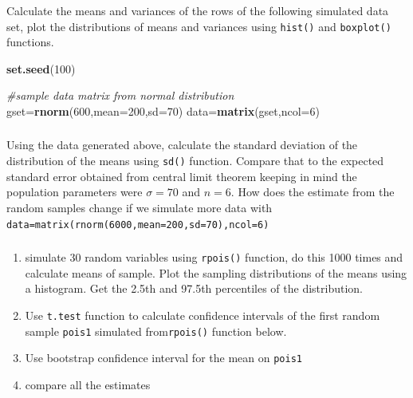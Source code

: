 \documentclass[12pt,]{krantz}
\newenvironment{Shaded}{\begin{snugshade}}{\end{snugshade}}
\newcommand{\CommentTok}[1]{\textcolor[rgb]{0.56,0.35,0.01}{\textit{#1}}}
\newcommand{\DataTypeTok}[1]{\textcolor[rgb]{0.13,0.29,0.53}{#1}}
\newcommand{\DecValTok}[1]{\textcolor[rgb]{0.00,0.00,0.81}{#1}}
\newcommand{\KeywordTok}[1]{\textcolor[rgb]{0.13,0.29,0.53}{\textbf{#1}}}
\newcommand{\NormalTok}[1]{#1}
\providecommand{\tightlist}{%
  \setlength{\itemsep}{0pt}\setlength{\parskip}{0pt}}
\begin{document}
\hypertarget{section}{%
\subsubsection{}\label{section}}

Calculate the means and variances
of the rows of the following simulated data set, plot the distributions
of means and variances using \texttt{hist()} and \texttt{boxplot()} functions.

\begin{Shaded}
\begin{Highlighting}[]
\KeywordTok{set.seed}\NormalTok{(}\DecValTok{100}\NormalTok{)}

\CommentTok{#sample data matrix from normal distribution}
\NormalTok{gset=}\KeywordTok{rnorm}\NormalTok{(}\DecValTok{600}\NormalTok{,}\DataTypeTok{mean=}\DecValTok{200}\NormalTok{,}\DataTypeTok{sd=}\DecValTok{70}\NormalTok{)}
\NormalTok{data=}\KeywordTok{matrix}\NormalTok{(gset,}\DataTypeTok{ncol=}\DecValTok{6}\NormalTok{)}
\end{Highlighting}
\end{Shaded}

\hypertarget{section-1}{%
\subsubsection{}\label{section-1}}

Using the data generated above, calculate the standard deviation of the
distribution of the means using \texttt{sd()} function. Compare that to the expected
standard error obtained from central limit theorem keeping in mind the
population parameters were \(\sigma=70\) and \(n=6\). How does the estimate
from the random samples change if we simulate more data with
\texttt{data=matrix(rnorm(6000,mean=200,sd=70),ncol=6)}

\hypertarget{section-2}{%
\subsubsection{}\label{section-2}}

\begin{enumerate}
\def\labelenumi{\arabic{enumi}.}
\setcounter{enumi}{-1}
\tightlist
\item
  simulate 30 random variables using \texttt{rpois()} function, do this 1000 times and calculate means of sample. Plot the sampling distributions of the means
  using a histogram. Get the 2.5th and 97.5th percentiles of the
  distribution.
\item
  Use \texttt{t.test} function to calculate confidence intervals
  of the first random sample \texttt{pois1} simulated from\texttt{rpois()} function below.
\item
  Use bootstrap confidence interval for the mean on \texttt{pois1}
\item
  compare all the estimates
\end{enumerate}
\end{document}
